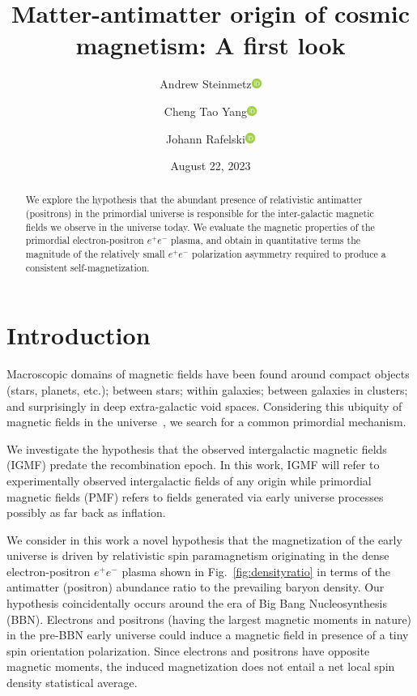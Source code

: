 \documentclass[aps,prd,floatfix,reprint]{revtex4-2}
\newcommand{\orcidicon}{\includegraphics[width=0.32cm]{orcid.pdf}}
\newcommand{\orc}[1]{\href{https://orcid.org/#1}{\orcidicon}}
\newcommand{\orcA}{0000-0001-8217-1484}
\newcommand{\orcB}{0000-0001-5038-8427}
\newcommand{\orcC}{0000-0001-5474-2649}
\newcommand{\rf}[1]{Fig.~{\ref{#1}}}
\begin{document}
\title{Matter-antimatter origin of cosmic magnetism: A first look}
\author{Andrew Steinmetz\orc{\orcC}}
\author{Cheng Tao Yang\orc{\orcB}}
\author{Johann Rafelski\orc{\orcA}}

\date{August 22, 2023}

\begin{abstract}
We explore the hypothesis that the abundant presence of relativistic antimatter (positrons) in the primordial universe is responsible for the inter-galactic magnetic fields we observe in the universe today. We evaluate the magnetic properties of the primordial electron-positron $e^{+}e^{-}$ plasma, and obtain in quantitative terms the magnitude of the relatively small $e^{+}e^{-}$ polarization asymmetry required to produce a consistent self-magnetization.
\end{abstract}


\maketitle

\section{Introduction}
\label{sec:introduction}
\noindent Macroscopic domains of magnetic fields have been found around compact objects (stars, planets, etc.); between stars; within galaxies; between galaxies in clusters; and surprisingly in deep extra-galactic void spaces. Considering this ubiquity of magnetic fields in the universe~\cite{Giovannini:2017rbc,Giovannini:2003yn,Kronberg:1993vk}, we search for a common primordial mechanism.

We investigate the hypothesis that the observed intergalactic magnetic fields (IGMF) predate the recombination epoch. In this work, IGMF will refer to experimentally observed intergalactic fields of any origin while primordial magnetic fields (PMF) refers to fields generated via early universe processes possibly as far back as inflation.

We consider in this work a novel hypothesis that the magnetization of the early universe is driven by relativistic spin paramagnetism originating in the dense electron-positron $e^{+}e^{-}$ plasma shown in \rf{fig:densityratio} in terms of the antimatter (positron) abundance ratio to the prevailing baryon density. Our hypothesis coincidentally occurs around the era of Big Bang Nucleosynthesis (BBN). Electrons and positrons (having the largest magnetic moments in nature) in the pre-BBN early universe could induce a magnetic field in presence of a tiny spin orientation polarization. Since electrons and positrons have opposite magnetic moments, the induced magnetization does not entail a net local spin density statistical average.
\end{document}
